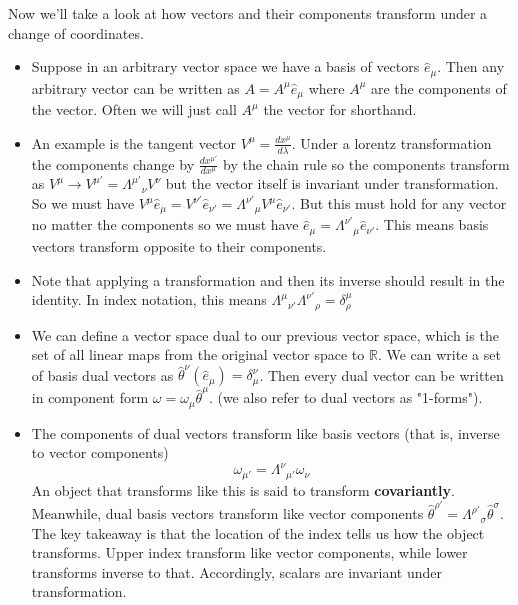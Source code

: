 \documentclass[11pt]{article}
\begin{document}
\noindent Now we'll take a look at how vectors and their components transform under a change of coordinates.
    \begin{itemize}
        \item Suppose in an arbitrary vector space we have a basis of vectors \( \hat{e}_{\mu} \). Then any arbitrary vector can be written as \( A = A^{\mu}\hat{e}_{\mu} \) where \( A^{\mu} \) are the components
        of the vector. Often we will just call \( A^{\mu} \) the vector for shorthand. 

        \item An example is the tangent vector \( V^{\mu} = \frac{dx^{\mu}}{d\lambda} \). Under a lorentz transformation the components change by \( \frac{dx^{\mu'}}{dx^{\mu}} \) by the chain rule so the components
        transform as \( V^{\mu} \rightarrow V^{\mu'} = \Lambda^{\mu'}{}_\nu V^{\nu}\) but the vector itself is invariant under transformation. So we must have 
        \(V^{\mu}\hat{e}_{\mu} = V^{\nu'}\hat{e}_{\nu'} = \Lambda^{\nu'}{}_\mu V^{\mu}\hat{e}_{\nu'} \). But this must hold for any vector no matter the components so we must have 
        \( \hat{e}_{\mu} = \Lambda^{\nu'}{}_\mu \hat{e}_{\nu'} \). This means basis vectors transform opposite to their components.

        \item Note that applying a transformation and then its inverse should result in the identity. In index notation, this means \(  \Lambda^{\mu}{}_{\nu'} \Lambda^{\nu'}{}_{\rho} = \delta^{\mu}_\rho \)

        \item We can define a vector space dual to our previous vector space, which is the set of all linear maps from the original vector space to \( \mathbb{R} \). We can write a set of basis dual vectors as 
        \( \hat{\theta}^{{\nu}}(\hat{e}_{\mu}) = \delta^{\nu}_\mu \). Then every dual vector can be written in component form \( \omega = \omega_{\mu}\hat{\theta}^{\mu}. \) (we also refer to dual vectors as "1-forms").

        \item The components of dual vectors transform like basis vectors (that is, inverse to vector components) 
        \[ 
            \omega_{\mu'} = \Lambda^{\nu}{}_{\mu'}\omega_{\nu} 
        \]
        An object that transforms like this is said to transform \textbf{covariantly}. Meanwhile, dual basis vectors transform like
        vector components \( \hat{\theta}^{\rho'} = \Lambda^{\rho'}{}_{\sigma}\hat{\theta}^{\sigma} \). The key takeaway is that the location of the index tells us how the object transforms. Upper index transform like vector
        components, while lower transforms inverse to that. Accordingly, scalars are invariant under transformation.


\end{itemize}
\end{document}
